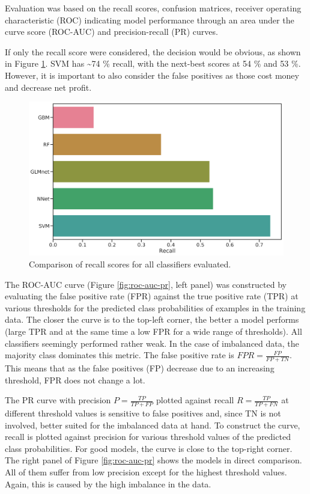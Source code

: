 \documentclass[
  11pt,
  a4paper,
  DIV=12,captions=tableheading,oneside,titlepage]{scrbook}
\begin{document}
Evaluation was based on the recall scores, confusion matrices, receiver operating characteristic (ROC) indicating model performance through an area under the curve score (ROC-AUC) and precision-recall (PR) curves.

If only the recall score were considered, the decision would be obvious, as shown in Figure \ref{fig:recall-scores}. SVM has \textasciitilde{}74 \% recall, with the next-best scores at 54 \% and 53 \%. However, it is important to also consider the false positives as those cost money and decrease net profit.



\begin{figure}

{\centering \includegraphics[width=0.7\linewidth]{figures/learning/recall-scores} 

}

\caption{Comparison of recall scores for all classifiers evaluated.}\label{fig:recall-scores}
\end{figure}

The ROC-AUC curve (Figure \ref{fig:roc-auc-pr}, left panel) was constructed by evaluating the false positive rate (FPR) against the true positive rate (TPR) at various thresholds for the predicted class probabilities of examples in the training data. The closer the curve is to the top-left corner, the better a model performs (large TPR and at the same time a low FPR for a wide range of thresholds). All classifiers seemingly performed rather weak. In the case of imbalanced data, the majority class dominates this metric. The false positive rate is \(FPR = \frac{FP}{FP+TN}\). This means that as the false positives (FP) decrease due to an increasing threshold, FPR does not change a lot.

The PR curve with precision \(P = \frac{TP}{TP+FP}\) plotted against recall \(R = \frac{TP}{{TP+FN}}\) at different threshold values is sensitive to false positives and, since TN is not involved, better suited for the imbalanced data at hand. To construct the curve, recall is plotted against precision for various threshold values of the predicted class probabilities. For good models, the curve is close to the top-right corner. The right panel of Figure \ref{fig:roc-auc-pr} shows the models in direct comparison. All of them suffer from low precision except for the highest threshold values. Again, this is caused by the high imbalance in the data.
\end{document}
